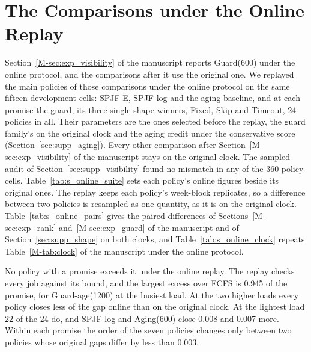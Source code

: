 \documentclass[mathematics,supfile,submit,moreauthors]{Definitions/mdpi}
\newcommand{\devnum}[1]{#1}
\begin{document}
\clearpage
\section{The Comparisons under the Online Replay}
\label{sec:s_online}

Section~\ref*{M-sec:exp_visibility} of the manuscript reports Guard(600) under the online
protocol, and the comparisons after it use the original one. We replayed the main policies
of those comparisons under the online protocol on the same fifteen development cells: SPJF-E,
SPJF-log and the aging baseline, and at each promise the guard, its three single-shape
winners, Fixed, Skip and Timeout, \devnum{24} policies in all. Their parameters are the ones
selected before the replay, the guard family's on the original clock and the aging credit
under the conservative score (Section~\ref{sec:supp_aging}). Every other comparison after
Section~\ref*{M-sec:exp_visibility} of the manuscript stays on the original clock. The
sampled audit of
Section~\ref{sec:supp_visibility} found no mismatch in
any of the 360 policy-cells. Table~\ref{tab:s_online_suite} sets each policy's online
figures beside its original ones. The replay keeps each policy's week-block replicates, so a
difference between two policies is resampled as one quantity, as it is on the original
clock. Table~\ref{tab:s_online_pairs} gives the paired differences of
Sections~\ref*{M-sec:exp_rank} and~\ref*{M-sec:exp_guard} of the manuscript and of
Section~\ref{sec:supp_shape} on both clocks, and Table~\ref{tab:s_online_clock} repeats Table~\ref*{M-tab:clock} of the
manuscript under the online protocol.

No policy with a promise exceeds it under the online replay. The replay checks every job
against its bound, and the largest excess over FCFS is \devnum{0.945} of the promise, for
Guard-age(1200) at the busiest load. At the two higher loads every policy closes less of the
gap online than on the original clock. At the lightest load \devnum{22} of the 24 do, and
SPJF-log and Aging(600) close \devnum{0.008} and \devnum{0.007} more. Within each promise
the order of the seven policies changes only between two policies whose original gaps differ
by less than \devnum{0.003}.
\end{document}
